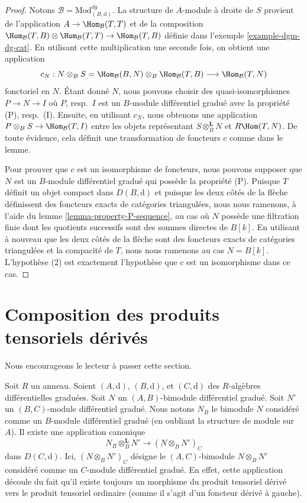 \begin{proof}
Notons $\mathcal{B} = \text{Mod}^{dg}_{(B, \text{d})}$. La
structure de $A$-module à droite de $S$ provient de l'application
$A \to \Hom_\mathcal{B}(T, T)$ et de la composition
$\Hom_\mathcal{B}(T, B) \otimes \Hom_\mathcal{B}(T, T) \to
\Hom_\mathcal{B}(T, B)$ définie dans l'exemple \ref{example-dgm-dg-cat}. En utilisant cette
multiplication une seconde fois, on obtient une application
$$
c_N :
N \otimes_B S = \Hom_\mathcal{B}(B, N) \otimes_B \Hom_\mathcal{B}(T, B)
\longrightarrow
\Hom_\mathcal{B}(T, N)
$$
fonctoriel en $N$. Étant donné $N$, nous pouvons choisir des
quasi-isomorphismes $P \to N \to I$ où $P$, resp.\ $I$ est un $B$-module différentiel gradué avec
la propriété (P), resp.\ (I). Ensuite, en utilisant $c_N$, nous obtenons
une application $P \otimes_B S \to \Hom_\mathcal{B}(T, I)$ entre les
objets représentant $S \otimes_B^\mathbf{L} N$ et $R\Hom(T, N)$. De toute
évidence, cela définit une transformation de foncteurs $c$ comme dans le lemme.

\medskip\noindent
Pour prouver que $c$ est un isomorphisme de foncteurs, nous
pouvons supposer que $N$ est un $B$-module différentiel gradué qui
possède la propriété (P). Puisque $T$ définit un objet compact
dans $D(B, \text{d})$ et puisque les deux côtés de la flèche définissent
des foncteurs exacts de catégories triangulées, nous nous ramenons, à
l'aide du lemme
\ref{lemma-property-P-sequence}, au cas où $N$ possède une filtration finie dont les
quotients successifs sont des sommes directes de $B[k]$. En utilisant à
nouveau que les deux côtés de la flèche sont des foncteurs exacts de
catégories triangulées et la compacité de $T$, nous nous
ramenons au cas $N = B[k]$. L'hypothèse (2) est exactement
l'hypothèse que $c$ est un isomorphisme dans ce cas.
\end{proof}






\section{Composition des produits tensoriels dérivés}
\label{section-compose-tensor-functors}

\noindent
Nous encourageons le lecteur à passer cette section.

\medskip\noindent
Soit $R$ un anneau. Soient $(A, \text{d})$, $(B, \text{d})$, et
$(C, \text{d})$ des $R$-algèbres différentielles graduées.
Soit $N$ un $(A, B)$-bimodule différentiel gradué. Soit $N'$
un $(B, C)$-module différentiel gradué. Nous notons
$N_B$ le bimodule $N$ considéré comme un $B$-module différentiel gradué (en
oubliant la structure de module sur $A$). Il existe une application canonique
\begin{equation}
\label{equation-plain-versus-derived}
N_B \otimes_B^\mathbf{L} N'
\longrightarrow
(N \otimes_B N')_C
\end{equation}
dans $D(C, \text{d})$. Ici, $(N \otimes_B N')_C$ désigne le $(A,
C)$-bimodule $N \otimes_B N'$ considéré comme un $C$-module
différentiel gradué. En effet, cette application découle du
fait qu'il existe toujours un morphisme du produit tensoriel dérivé vers le produit
tensoriel ordinaire (comme il s'agit d'un foncteur dérivé à gauche).

